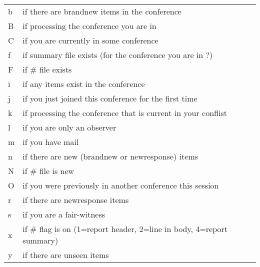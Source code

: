 \documentclass[twoside]{report}
\begin{document}
         \tablelasttail{\hline}
         \begin{supertabular}{ll}
            b     & if there are brandnew 
                    items in the conference \\
            B     & if processing the conference you are in \\
            C     & if you are currently in some conference \\
            f     & if summary file exists (for the conference you are in ?) \\
            F     & if \# file exists \\
            i     & if any items exist in the conference  \\
            j     & if you just joined this conference for the first time \\
            k     & if processing the conference that is current in 
                    your conflist \\
            l     & if you are only an observer \\
            m     & if you have mail \\
            n     & if there are new (brandnew or newresponse) items \\
            N     & if \# file is new \\
            O     & if you were previously in another conference this session \\
            r     & if there are newresponse 
                    items \\
            s     & if you are a fair-witness \\
            x     & if \# flag is on (1=report header, 2=line in body, 
                    4=report summary) \\
            y     & if there are unseen items \\
         \end{supertabular}
\vspace{12pt}
\end{document}
